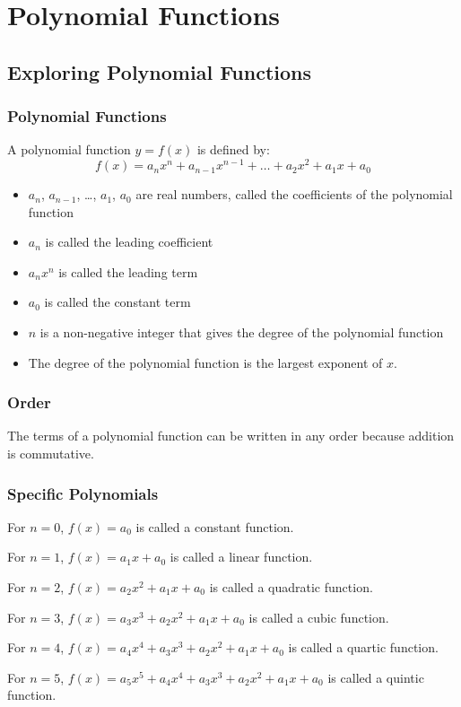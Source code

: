 \setcounter{chapter}{2}
\chapter{Polynomial Functions}
	\section{Exploring Polynomial Functions}
		\subsection{Polynomial Functions}
			A polynomial function $y=f(x)$ is defined by:
			\[f(x)=a_nx^n + a_{n-1}x^{n-1} + \dots + a_2x^2 + a_1x+a_0\]

			\begin{itemize}
				\item $a_n$, $a_{n-1}$, \dots , $a_1$, $a_0$ are real  numbers, called the coefficients of the polynomial function
				\item $a_n$ is called the leading coefficient
				\item $a_nx^n$ is called the leading term
				\item $a_0$ is called the constant term
				\item $n$ is a non-negative integer that gives the degree of the polynomial function
				\item The degree of the polynomial function is the largest exponent of $x$.
			\end{itemize}
		\subsection{Order}
			The terms of a polynomial function can be written in any order because addition is commutative.
		\subsection{Specific Polynomials}
			For $n=0$, $f(x)=a_0$ is called a constant function.

			For $n=1$, $f(x)=a_1x+a_0$ is called a linear function.

			For $n=2$, $f(x)=a_2x^2+a_1x+a_0$ is called a quadratic function.

			For $n=3$, $f(x)=a_3x^3+a_2x^2+a_1x+a_0$ is called a cubic function.

			For $n=4$, $f(x)=a_4x^4+a_3x^3+a_2x^2+a_1x+a_0$ is called a quartic function.

			For $n=5$, $f(x)=a_5x^5+a_4x^4+a_3x^3+a_2x^2+a_1x+a_0$ is called a quintic function.
